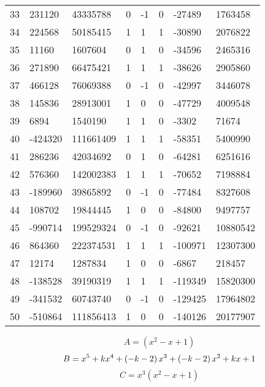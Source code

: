 \documentclass{amsart}
\begin{document}
\begin{longtable}{|l|l|l|lllll|}
33&231120&43335788&0&-1&0&-27489&1763458\\
34&224568&50185415&1&1&1&-30890&2076822\\
35&11160&1607604&0&1&0&-34596&2465316\\
36&271890&66475421&1&1&1&-38626&2905860\\
37&466128&76069388&0&-1&0&-42997&3446078\\
38&145836&28913001&1&0&0&-47729&4009548\\
39&6894&1540190&1&1&0&-3302&71674\\
40&-424320&111661409&1&1&1&-58351&5400990\\
41&286236&42034692&0&1&0&-64281&6251616\\
42&576360&142002383&1&1&1&-70652&7198884\\
43&-189960&39865892&0&-1&0&-77484&8327608\\
44&108702&19844445&1&0&0&-84800&9497757\\
45&-990714&199529324&0&-1&0&-92621&10880542\\
46&864360&222374531&1&1&1&-100971&12307300\\
47&12174&1287834&1&0&0&-6867&218457\\
48&-138528&39190319&1&1&1&-119349&15820300\\
49&-341532&60743740&0&-1&0&-129425&17964802\\
50&-510864&111856413&1&0&0&-140126&20177907\\
\hline
\end{longtable}
$$A=(x^2
 - x
 + 1)$$
$$B=x^5
 + k\*x^4
 + \left(-k
 - 2\right) \*x^3
 + \left(-k
 - 2\right) \*x^2
 + k\*x
 + 1$$
$$C=x^3(x^2
 - x
 + 1)$$
\end{document}
